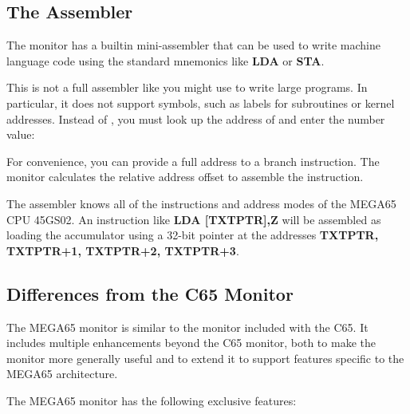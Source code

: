 \subsection{The Assembler}

The monitor has a builtin mini-assembler that can be used to write machine language code using the standard mnemonics like {\bf LDA} or {\bf STA}.

This is not a full assembler like you might use to write large programs. In particular, it does not support symbols, such as labels for subroutines or kernel addresses. Instead of {}, you must look up the address of {} and enter the number value: {}

For convenience, you can provide a full address to a branch instruction. The monitor calculates the relative address offset to assemble the instruction.

The assembler knows all of the instructions and address modes of the MEGA65
CPU 45GS02. An instruction like {\ttfamily \bf LDA [TXTPTR],Z}
will be assembled as loading the accumulator using a 32-bit pointer
at the addresses {\ttfamily \bf TXTPTR, TXTPTR+1, TXTPTR+2, TXTPTR+3}.

\subsection{Differences from the C65 Monitor}

The MEGA65 monitor is similar to the monitor included with the C65. It includes multiple enhancements beyond the C65 monitor, both to make the monitor more generally useful and to extend it to support features specific to the MEGA65 architecture.

The MEGA65 monitor has the following exclusive features:

